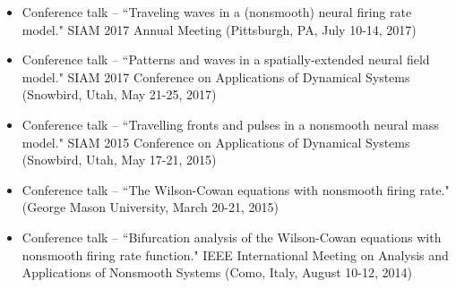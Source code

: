 \documentclass[a4paper,10pt]{article}
\begin{document}
{    %
    \begin{itemize}[leftmargin=*]
    	\item Conference talk -- ``Traveling waves in a (nonsmooth) neural firing rate model." SIAM 2017 Annual Meeting (Pittsburgh, PA, July 10-14, 2017) \\
	\item Conference talk -- ``Patterns and waves in a spatially-extended neural field model." SIAM 2017 Conference on Applications of Dynamical Systems \\(Snowbird, Utah, May 21-25, 2017) \\
    	\item Conference talk -- ``Travelling fronts and pulses in a nonsmooth neural mass model." SIAM 2015 Conference on Applications of Dynamical Systems \\(Snowbird, Utah, May 17-21, 2015) \\
	\item Conference talk -- ``The Wilson-Cowan equations with nonsmooth firing rate." (George Mason University, March 20-21, 2015) \\
	\item Conference talk --  ``Bifurcation analysis of the Wilson-Cowan equations with nonsmooth firing rate function." IEEE International Meeting on Analysis and Applications of Nonsmooth Systems (Como, Italy, August 10-12, 2014) \\
    \end{itemize}
}
\end{document}
